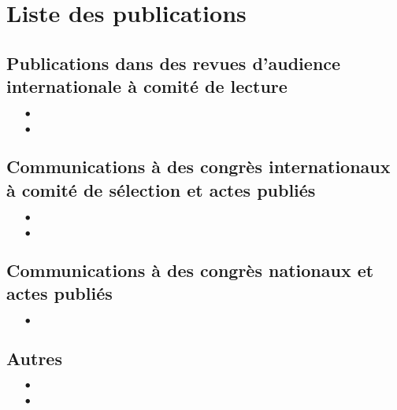 \chapter*{Liste des publications}

\section*{Publications dans des revues d'audience internationale à comité de lecture}
\begin{itemize}
\item[$\bullet$] 
\item[$\bullet$] 
\end{itemize}


\section*{Communications à des congrès internationaux à comité de sélection et actes publiés}
\begin{itemize}
\item[$\bullet$] 
\item[$\bullet$] 
\end{itemize}

\section*{Communications à des congrès nationaux et actes publiés}
\begin{itemize}
\item[$\bullet$] 
\end{itemize}

\section*{Autres}
\begin{itemize}
\item[$\bullet$] 
\item[$\bullet$] 
\end{itemize}
